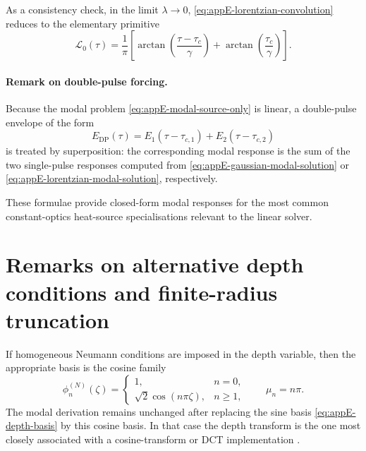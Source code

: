 As a consistency check, in the limit \(\lambda\to 0\),
\eqref{eq:appE-lorentzian-convolution} reduces to the elementary primitive
\begin{equation}
    \mathcal{L}_{0}(\tau)
    =
    \frac{1}{\pi}
    \left[
        \arctan\!\left(\frac{\tau-\tau_c}{\gamma}\right)
        +
        \arctan\!\left(\frac{\tau_c}{\gamma}\right)
        \right].
    \label{eq:appE-lorentzian-zero-mode-check}
\end{equation}

\paragraph{Remark on double-pulse forcing.}
Because the modal problem \eqref{eq:appE-modal-source-only} is linear, a
double-pulse envelope of the form
\[
    E_{\mathrm{DP}}(\tau)
    =
    E_1(\tau-\tau_{c,1})+E_2(\tau-\tau_{c,2})
\]
is treated by superposition: the corresponding modal response is the sum of
the two single-pulse responses computed from
\eqref{eq:appE-gaussian-modal-solution} or
\eqref{eq:appE-lorentzian-modal-solution}, respectively.

These formulae provide closed-form modal responses for the most common
constant-optics heat-source specialisations relevant to the linear solver.

\section{Remarks on alternative depth conditions and finite-radius truncation}
\label{sec:appE-extensions}

\begin{remark}
    \label{rem:appE-neumann-case}
    If homogeneous Neumann conditions are imposed in the depth variable, then the
    appropriate basis is the cosine family
    \[
        \phi_n^{(N)}(\zeta)=
        \begin{cases}
            1,                       & n=0,    \\[2pt]
            \sqrt{2}\cos(n\pi\zeta), & n\ge 1,
        \end{cases}
        \qquad
        \mu_n=n\pi.
    \]
    The modal derivation remains unchanged after replacing the sine basis
    \eqref{eq:appE-depth-basis} by this cosine basis. In that case the depth
    transform is the one most closely associated with a cosine-transform or DCT
    implementation \cite{Rogers_2012}.
\end{remark}

